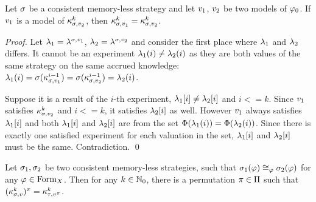 \begin{lemma} \label{lma-accruedknowledge}
Let $\sigma$ be a consistent memory-less strategy and let $v_1$, $v_2$ be two models of $\varphi_0$.
If $v_1$ is a model of $\kappa_{\sigma, v_2}^{k}$, then $\kappa_{\sigma, v_1}^{k} = \kappa_{\sigma, v_2}^{k}$.
\end{lemma}
\begin{proof}
Let $\lambda_1 = \lambda^{\sigma,v_1}$, $\lambda_2 = \lambda^{\sigma,v_2}$
and consider the first place where $\lambda_1$ and $\lambda_2$ differs.
It cannot be an experiment $\lambda_1(i) \not= \lambda_2(i)$ as they are both
  values of the same strategy on the same accrued knowledge:
$\lambda_1(i) = \sigma(\kappa_{\sigma, v_1}^{i-1}) =
              \sigma(\kappa_{\sigma, v_2}^{i-1}) = \lambda_2(i)$.

Suppose it is a result of the $i$-th experiment, $\lambda_1[i] \not= \lambda_2[i]$
  and $i <= k$.
Since $v_1$ satisfies $\kappa_{\sigma, v_2}^{k}$ and $i <= k$,
  it satisfies $\lambda_2[i]$ as well.
However $v_1$ always satisfies $\lambda_1[i]$ and
  both $\lambda_1[i]$ and $\lambda_2[i]$ are from the set
  $\Phi(\lambda_1(i)) = \Phi(\lambda_2(i))$.
Since there is exactly one satisfied experiment for each valuation in the set,
  $\lambda_1[i]$ and $\lambda_2[i]$ must be the same.
Contradiction. \qed
\end{proof}

\begin{theorem}
Let $\sigma_1, \sigma_2$ be two consistent memory-less strategies, such that
$\sigma_1(\varphi) \cong_{\varphi} \sigma_2(\varphi)$ for any $\varphi\in\textrm{Form}_X$.
Then for any $k\in\mathbb{N}_0$, there is a permutation $\pi\in \Pi$ such that
 $(\kappa_{\sigma, v}^{k})^\pi = \kappa_{\tau, v^\pi}^{k}$.
\end{theorem}

